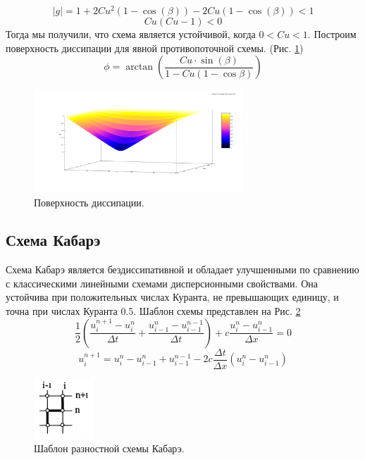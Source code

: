 \begin{equation}
    |g|=1+2Cu^2(1-\cos(\beta))-2Cu(1-\cos(\beta))<1
\end{equation}
\begin{equation}
    Cu(Cu-1)<0
\end{equation}
Тогда мы получили, что схема является устойчивой, когда $0<Cu<1$. Построим поверхность диссипации для явной противопоточной схемы. (Рис. \ref{fig:12})
\begin{equation}
    \phi=\arctan(\frac{Cu\cdot \sin(\beta)}{1-Cu(1-\cos{\beta})})
\end{equation}
\begin{figure}[H]
    \centering
    \includegraphics[width=0.7\textwidth]{images/14.png}
    \caption{Поверхность диссипации.}
    \label{fig:12}
\end{figure}



\subsection{Схема Кабарэ}
Схема Кабарэ является бездиссипативной и обладает улучшенными по сравнению с
классическими линейными схемами дисперсионными свойствами. Она устойчива при положительных числах Куранта, не превышающих единицу, и точна при числах Куранта 0.5. Шаблон схемы представлен на Рис. \ref{fig:10}
\begin{equation}
    \frac{1}{2}\left(\frac{u_i^{n+1}-u_i^n}{\Delta t}+\frac{u_{i-1}^{n}-u_{i-1}^{n-1}}{\Delta t}\right) +c \frac{u_i^{n}-u_{i-1}^n}{\Delta x}=0
\end{equation}
\begin{equation}
    u^{n+1}_i=u^n_i-u^n_{i-1}+u^{n-1}_{i-1}-2c\frac{\Delta t}{\Delta x}(u^n_i-u^n_{i-1})
\end{equation}
\begin{figure}[H]
    \centering
    \includegraphics[width=0.2\textwidth]{images/11.png}
    \caption{Шаблон разностной схемы Кабарэ.}
    \label{fig:10}
\end{figure}

